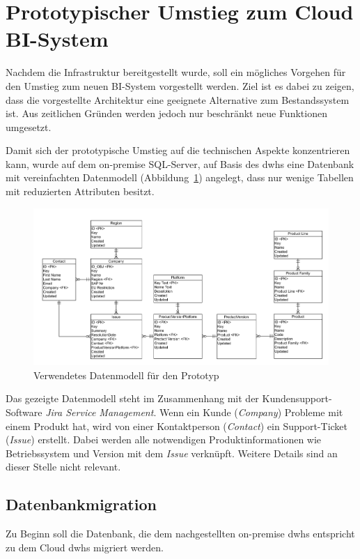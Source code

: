 \section{Prototypischer Umstieg zum Cloud BI-System} \label{sec:praktischeUmsetzung:Migration}
Nachdem die Infrastruktur bereitgestellt wurde, soll ein mögliches Vorgehen für den Umstieg zum neuen BI-System vorgestellt werden. Ziel ist es dabei zu zeigen, dass die vorgestellte Architektur eine geeignete Alternative zum Bestandssystem ist. Aus zeitlichen Gründen werden jedoch nur beschränkt neue Funktionen umgesetzt.

Damit sich der prototypische Umstieg auf die technischen Aspekte konzentrieren kann, wurde auf dem on-premise SQL-Server, auf Basis des \acp{dwh} eine Datenbank mit vereinfachten Datenmodell (Abbildung~\ref{fig:praktischeUmsetzung:dataModel}) angelegt, dass nur wenige Tabellen mit reduzierten Attributen besitzt. 

\begin{figure}[htbp]
 \centering
 \includegraphics[width=\textwidth]{gfx/data_model.png}
 \caption{Verwendetes Datenmodell für den Prototyp}
\label{fig:praktischeUmsetzung:dataModel}
\end{figure}

\noindent Das gezeigte Datenmodell steht im Zusammenhang mit der Kundensupport-Software \textit{Jira Service Management}. Wenn ein Kunde (\textit{Company}) Probleme mit einem Produkt hat, wird von einer Kontaktperson (\textit{Contact}) ein Support-Ticket (\textit{Issue}) erstellt. Dabei werden alle notwendigen Produktinformationen wie Betriebssystem und Version mit dem \textit{Issue} verknüpft. Weitere Details sind an dieser Stelle nicht relevant.

\subsection{Datenbankmigration} \label{subsec:praktischeUmsetzung:Datenmigration}
Zu Beginn soll die Datenbank, die dem nachgestellten on-premise \acp{dwh} entspricht zu dem Cloud \acp{dwh} migriert werden. 

